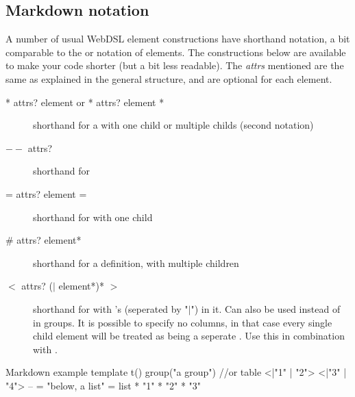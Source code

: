 \subsection{Markdown notation}
A number of usual WebDSL element constructions have shorthand notation, a bit comparable to the  or  notation of  elements. The constructions below are available to make your code shorter (but a bit less readable). The \emph{attrs} mentioned  are the same as explained in the general structure, and are optional for each element. 
\begin{description}
	\item[* attrs? element  or  * attrs? { element * } ]\ii{*{ \ldots }}\ii{* \ldots } shorthand for a  with one child or multiple childs (second notation)
	\item[$--$ attrs?]\ii{$--$} shorthand for 
	\item[= attrs? element =]\ii{= \ldots =} shorthand for  with one child
	\item[\# attrs? { element* }]\ii{\#{\ldots}} shorthand for a  definition, with multiple children
	\item[$<$ attrs? ($|$ element*)* $>$]
		\ii{$< | \ldots\ > $}
		\ii{$< \ldots\ >$}
		\ii{$ | \ldots\ $}
		 shorthand for  with 's (seperated by "$|$") in it. Can also be used instead of  in groups. It is possible to specify no columns, in that case every single child element will be treated as being a seperate . Use this in combination with .
\end{description}
\begin{webdsl}{Markdown example}
template t() {
	group("a group") { //or table
		<|"1" | "2">
		<|"3" | "4">
	}  
	--
	= "below, a list" =
	list {
		* "1"
		* "2"
		* "3"
	}
}
\end{webdsl}
